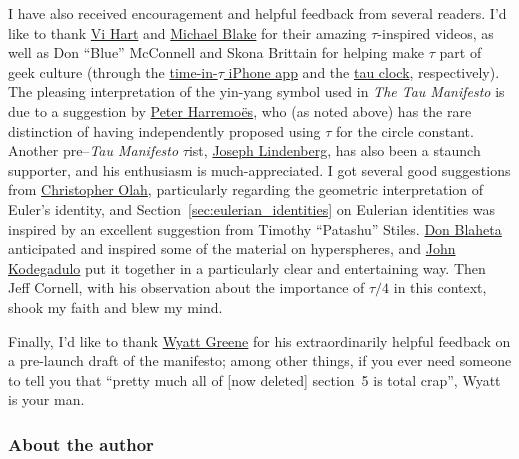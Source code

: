 I have also received encouragement and helpful feedback from several readers. I'd like to thank \href{https://www.youtube.com/watch?v=jG7vhMMXagQ}{Vi Hart} and \href{https://www.youtube.com/watch?v=3174T-3-59Q}{Michael Blake} for their amazing $\tau$-inspired videos, as well as Don ``Blue'' McConnell and Skona Brittain for helping make $\tau$ part of geek culture (through the \href{http://tauclock.com/}{time-in-$\tau$ iPhone app} and the \href{http://www.sbcrafts.net/clocks/}{tau clock}, respectively). The pleasing interpretation of the yin-yang symbol used in \emph{The Tau Manifesto} is due to a suggestion by \href{http://www.harremoes.dk/Peter/}{Peter Harremo\"{e}s}, who (as noted above) has the rare distinction of having independently proposed using $\tau$ for the circle constant. Another pre--\emph{Tau Manifesto} $\tau$ist, \href{https://sites.google.com/site/taubeforeitwascool/}{Joseph Lindenberg}, has also been a staunch supporter, and his enthusiasm is much-appreciated. I got several good suggestions from \href{https://christopherolah.wordpress.com/about-me}{Christopher Olah}, particularly regarding the geometric interpretation of Euler's identity, and Section~\ref{sec:eulerian_identities} on Eulerian identities was inspired by an excellent suggestion from Timothy ``Patashu'' Stiles. \href{http://www.blahedo.org/blog/archives/001083.html}{Don Blaheta} anticipated and inspired some of the material on hyperspheres, and \href{http://spikedmath.com/forum/viewtopic.php?f=30&t=147\#p1577}{John Kodegadulo} put it together in a particularly clear and entertaining way. Then Jeff Cornell, with his observation about the importance of $\tau/4$ in this context, shook my faith and blew my mind.

Finally, I'd like to thank \href{https://techiferous.com/}{Wyatt Greene} for his extraordinarily helpful feedback on a pre-launch draft of the manifesto; among other things, if you ever need someone to tell you that ``pretty much all of [now deleted] section~5 is total crap'', Wyatt is your man.



    \subsubsection{About the author} %
    \label{sec:about_the_author}


